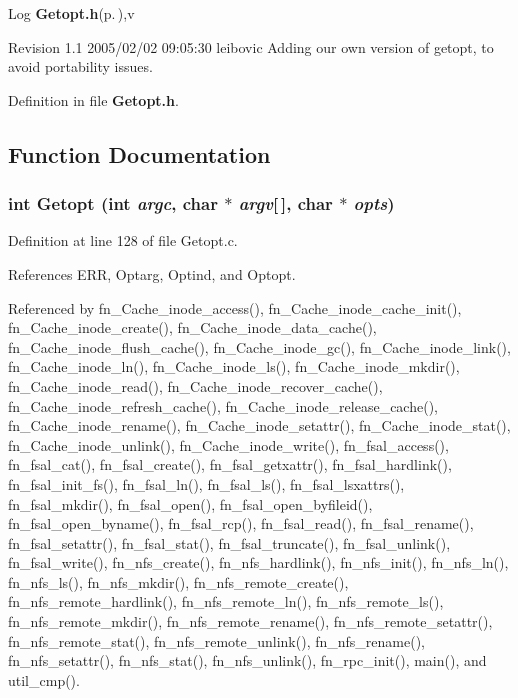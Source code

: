 \begin{Desc}
\item[Log]{\bf Getopt.h}{\rm (p.\,\pageref{Getopt_8h})},v \end{Desc}
Revision 1.1 2005/02/02 09:05:30 leibovic Adding our own version of getopt, to avoid portability issues.

Definition in file {\bf Getopt.h}.

\subsection{Function Documentation}
\subsubsection{\setlength{\rightskip}{0pt plus 5cm}int Getopt (int {\em argc}, char $\ast$ {\em argv}[$\,$], char $\ast$ {\em opts})}\label{Getopt_8h_a4}




Definition at line 128 of file Getopt.c.

References ERR, Optarg, Optind, and Optopt.

Referenced by fn\_\-Cache\_\-inode\_\-access(), fn\_\-Cache\_\-inode\_\-cache\_\-init(), fn\_\-Cache\_\-inode\_\-create(), fn\_\-Cache\_\-inode\_\-data\_\-cache(), fn\_\-Cache\_\-inode\_\-flush\_\-cache(), fn\_\-Cache\_\-inode\_\-gc(), fn\_\-Cache\_\-inode\_\-link(), fn\_\-Cache\_\-inode\_\-ln(), fn\_\-Cache\_\-inode\_\-ls(), fn\_\-Cache\_\-inode\_\-mkdir(), fn\_\-Cache\_\-inode\_\-read(), fn\_\-Cache\_\-inode\_\-recover\_\-cache(), fn\_\-Cache\_\-inode\_\-refresh\_\-cache(), fn\_\-Cache\_\-inode\_\-release\_\-cache(), fn\_\-Cache\_\-inode\_\-rename(), fn\_\-Cache\_\-inode\_\-setattr(), fn\_\-Cache\_\-inode\_\-stat(), fn\_\-Cache\_\-inode\_\-unlink(), fn\_\-Cache\_\-inode\_\-write(), fn\_\-fsal\_\-access(), fn\_\-fsal\_\-cat(), fn\_\-fsal\_\-create(), fn\_\-fsal\_\-getxattr(), fn\_\-fsal\_\-hardlink(), fn\_\-fsal\_\-init\_\-fs(), fn\_\-fsal\_\-ln(), fn\_\-fsal\_\-ls(), fn\_\-fsal\_\-lsxattrs(), fn\_\-fsal\_\-mkdir(), fn\_\-fsal\_\-open(), fn\_\-fsal\_\-open\_\-byfileid(), fn\_\-fsal\_\-open\_\-byname(), fn\_\-fsal\_\-rcp(), fn\_\-fsal\_\-read(), fn\_\-fsal\_\-rename(), fn\_\-fsal\_\-setattr(), fn\_\-fsal\_\-stat(), fn\_\-fsal\_\-truncate(), fn\_\-fsal\_\-unlink(), fn\_\-fsal\_\-write(), fn\_\-nfs\_\-create(), fn\_\-nfs\_\-hardlink(), fn\_\-nfs\_\-init(), fn\_\-nfs\_\-ln(), fn\_\-nfs\_\-ls(), fn\_\-nfs\_\-mkdir(), fn\_\-nfs\_\-remote\_\-create(), fn\_\-nfs\_\-remote\_\-hardlink(), fn\_\-nfs\_\-remote\_\-ln(), fn\_\-nfs\_\-remote\_\-ls(), fn\_\-nfs\_\-remote\_\-mkdir(), fn\_\-nfs\_\-remote\_\-rename(), fn\_\-nfs\_\-remote\_\-setattr(), fn\_\-nfs\_\-remote\_\-stat(), fn\_\-nfs\_\-remote\_\-unlink(), fn\_\-nfs\_\-rename(), fn\_\-nfs\_\-setattr(), fn\_\-nfs\_\-stat(), fn\_\-nfs\_\-unlink(), fn\_\-rpc\_\-init(), main(), and util\_\-cmp().

